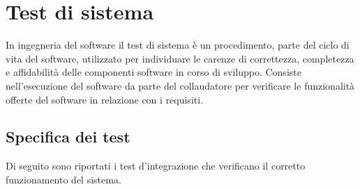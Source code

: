 \section{Test di sistema}\label{sec:test-di-sistema}
In ingegneria del software il test di sistema è un procedimento, parte del ciclo di vita del software, utilizzato per individuare le carenze di correttezza, completezza e affidabilità delle componenti software in corso di sviluppo.
Consiste nell'esecuzione del software da parte del collaudatore per verificare le funzionalità offerte del software in relazione con i requisiti.
\setcounter{rowcount}{0}

\subsection{Specifica dei test}\label{subsec:specifica-dei-test-sistema}
Di seguito sono riportati i test d'integrazione che verificano il corretto funzionamento del sistema.
